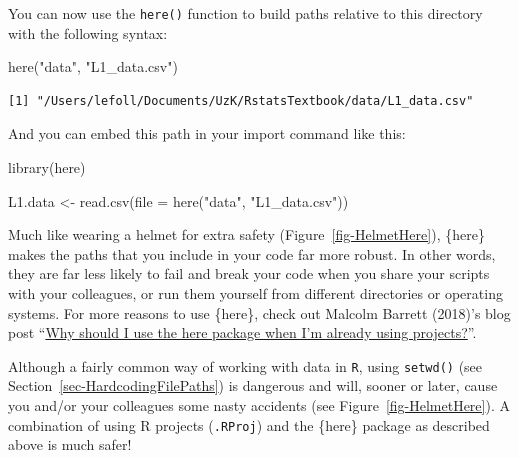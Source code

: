 \documentclass[
  letterpaper,
  DIV=11,
  numbers=noendperiod]{scrreprt}
\newenvironment{Shaded}{\begin{snugshade}}{\end{snugshade}}
\newcommand{\AttributeTok}[1]{\textcolor[rgb]{0.40,0.45,0.13}{#1}}
\newcommand{\FunctionTok}[1]{\textcolor[rgb]{0.28,0.35,0.67}{#1}}
\newcommand{\NormalTok}[1]{\textcolor[rgb]{0.00,0.23,0.31}{#1}}
\newcommand{\OtherTok}[1]{\textcolor[rgb]{0.00,0.23,0.31}{#1}}
\newcommand{\StringTok}[1]{\textcolor[rgb]{0.13,0.47,0.30}{#1}}
\begin{document}
\begin{tcolorbox}
You can now use the \texttt{here()} function to build paths relative to
this directory with the following syntax:

\begin{Shaded}
\begin{Highlighting}[]
\FunctionTok{here}\NormalTok{(}\StringTok{"data"}\NormalTok{, }\StringTok{"L1\_data.csv"}\NormalTok{)}
\end{Highlighting}
\end{Shaded}

\begin{verbatim}
[1] "/Users/lefoll/Documents/UzK/RstatsTextbook/data/L1_data.csv"
\end{verbatim}

And you can embed this path in your import command like this:

\begin{Shaded}
\begin{Highlighting}[]
\FunctionTok{library}\NormalTok{(here)}

\NormalTok{L1.data }\OtherTok{\textless{}{-}} \FunctionTok{read.csv}\NormalTok{(}\AttributeTok{file =} \FunctionTok{here}\NormalTok{(}\StringTok{"data"}\NormalTok{, }\StringTok{"L1\_data.csv"}\NormalTok{))}
\end{Highlighting}
\end{Shaded}

Much like wearing a helmet for extra safety
(Figure~\ref{fig-HelmetHere}), \{here\} makes the paths that you include
in your code far more robust. In other words, they are far less likely
to fail and break your code when you share your scripts with your
colleagues, or run them yourself from different directories or operating
systems. For more reasons to use \{here\}, check out Malcolm Barrett
(2018)'s blog post
``\href{https://malco.io/articles/2018-11-05-why-should-i-use-the-here-package-when-i-m-already-using-projects}{Why
should I use the here package when I'm already using projects?}''.

\end{tcolorbox}

Although a fairly common way of working with data in \texttt{R}, using
\texttt{setwd()} (see Section~\ref{sec-HardcodingFilePaths}) is
dangerous and will, sooner or later, cause you and/or your colleagues
some nasty accidents (see Figure~\ref{fig-HelmetHere}). A combination of
using R projects (\texttt{.RProj}) and the \{here\} package as described
above is much safer!
\end{document}
